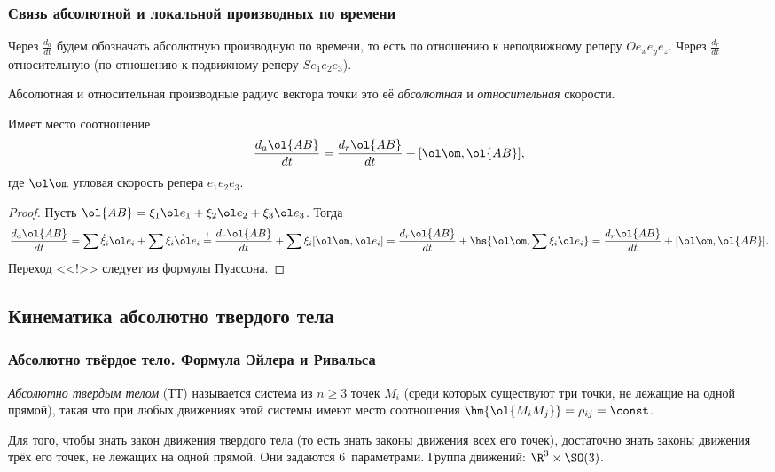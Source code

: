 \documentclass[a4paper,12pt]{article}
\def\w{\ol\om}
\def\e{\ol e}
\def\d{\dot}
\begin{document}
\subsubsection{Связь абсолютной и локальной производных по времени}

Через $\frac{d_a}{dt}$ будем обозначать абсолютную производную по времени,
то есть по отношению к неподвижному реперу $Oe_xe_ye_z$.
Через $\frac{d_r}{dt}$ относительную (по отношению к подвижному реперу $Se_1e_2e_3$).

\begin{df}
Абсолютная и относительная производные радиус вектора точки это её \emph{абсолютная}
и \emph{относительная} скорости.
\end{df}

\begin{stm} Имеет место соотношение
$$\frac{d_a\ol{AB}}{dt}=\frac{d_r\ol{AB}}{dt}+[\w,\ol{AB}],$$
где $\w$ угловая скорость репера $e_1e_2e_3$.
\end{stm}
\begin{proof}
Пусть $\ol{AB}=\xi_1\e_1+\xi_2\e_2+\xi_3\e_3$.
Тогда
$$
\frac{d_a\ol{AB}}{dt}=\sum\d\xi_i\e_i+\sum\xi_i\d\e_i\stackrel{!}{=}
\frac{d_r\ol{AB}}{dt}+\sum\xi_i[\w,\e_i] =\frac{d_r\ol{AB}}{dt}+\hs{\w, \sum\xi_i \e_i}=
\frac{d_r\ol{AB}}{dt}+[\w,\ol {AB}].$$
Переход <<!>> следует из формулы Пуассона.
\end{proof}

\subsection{Кинематика абсолютно твердого тела}

\subsubsection{Абсолютно твёрдое тело. Формула Эйлера и Ривальса}

\begin{df}
\emph{Абсолютно твердым телом} (ТТ) называется система
из $n\ge 3$ точек $M_i$ (среди которых существуют три точки, не
лежащие на одной прямой), такая что при любых движениях этой системы
имеют место соотношения $\hm{\ol{M_iM_j}}=\rho_{ij}=\const$.
\end{df}

Для того, чтобы знать закон движения твердого тела (то есть знать
законы движения всех его точек), достаточно знать законы движения трёх его точек,
не лежащих на одной прямой. Они задаются 6~параметрами.
Группа движений: $\R^3\times \SO(3)$.
\end{document}
